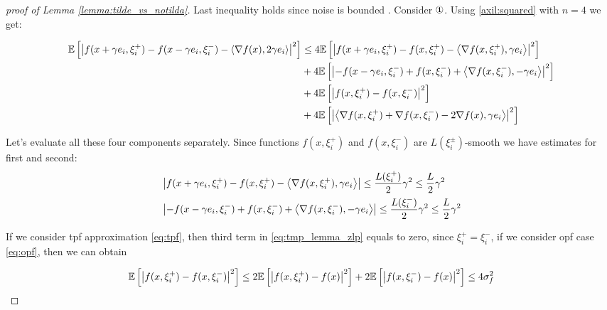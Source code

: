 \begin{proof}[proof of Lemma \ref{lemma:tilde_vs_notilda}]
        Last inequality holds since noise is bounded . Consider $\circledOne$. Using \ref{axil:squared} with $n = 4$ we get:

        \begin{equation}
        \label{eq:tmp_lemma_zlp}
        \begin{split}
            \mathbb{E}\left[ \left| f(x + \gamma e_i, \xi^+_i) - f(x - \gamma e_i, \xi^-_i) - \left\langle \nabla f(x),2 \gamma e_i \right\rangle \right|^2 \right]
            &\leq
            4 \mathbb{E}\left[ \left| f(x + \gamma e_i, \xi^+_i) - f(x, \xi^+_i) - \left\langle \nabla f(x, \xi^+_i), \gamma e_i \right\rangle \right|^2 \right]
            \\&+
            4 \mathbb{E}\left[ \left|- f(x - \gamma e_i, \xi^-_i) + f(x, \xi^-_i) + \left\langle \nabla f(x, \xi^-_i),-\gamma e_i \right\rangle \right|^2 \right]
            \\&+
            4 \mathbb{E}\left[ \left| f(x, \xi^+_i) - f(x, \xi^-_i) \right|^2 \right]
            \\&+ 
            4 \mathbb{E}\left[ \left| \left\langle \nabla f(x, \xi^+_i) + \nabla f(x, \xi^-_i) - 2 \nabla f(x),\gamma e_i \right\rangle \right|^2 \right]
        \end{split}
        \end{equation}

        Let's evaluate all these four components separately. Since functions $f(x, \xi^+_i)$ and $f(x, \xi^-_i)$ are $L(\xi^{\pm}_i)$-smooth we have estimates for first and second:
        \begin{equation}
        \label{eq:tmp_first_and_second_zlp}
        \begin{split}
            &\left| f(x + \gamma e_i, \xi^+_i) - f(x, \xi^+_i) - \left\langle \nabla f(x, \xi^+_i), \gamma e_i \right\rangle \right| \leq \frac{L(\xi_i^+)}{2} \gamma^2 \leq \frac{L}{2} \gamma^2
            \\&\left|- f(x - \gamma e_i, \xi^-_i) + f(x, \xi^-_i) + \left\langle \nabla f(x, \xi^-_i),-\gamma e_i \right\rangle \right| \leq \frac{L(\xi_i^-)}{2} \gamma^2 \leq \frac{L}{2} \gamma^2
        \end{split}
        \end{equation}

        If we consider tpf approximation \eqref{eq:tpf}, then third term in \eqref{eq:tmp_lemma_zlp} equals to zero, since $\xi^+_i = \xi^-_i$, if we consider opf case \eqref{eq:opf}, then we can obtain

        \begin{equation}
        \label{eq:tmp_third_zlp}
            \mathbb{E}\left[ \left| f(x, \xi^+_i) - f(x, \xi^-_i) \right|^2 \right]
            \leq 2\mathbb{E}\left[ \left| f(x, \xi^+_i) - f(x) \right|^2 \right] + 2\mathbb{E}\left[ \left| f(x, \xi^-_i) - f(x) \right|^2 \right] \leq 4 \sigma_f^2
        \end{equation}


\end{proof}

